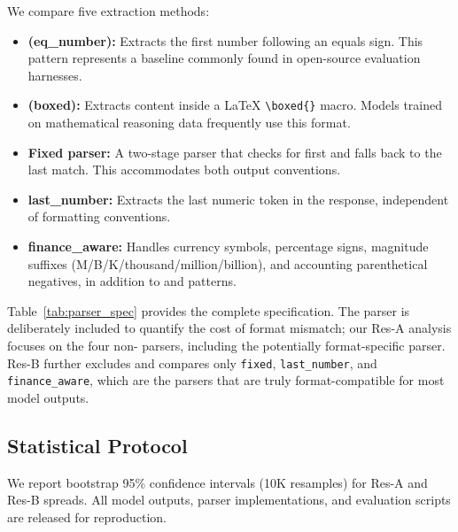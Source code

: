 We compare five extraction methods:

\begin{itemize}
    \item \textbf{\numparser{} (eq\_number):} Extracts the first number following an equals sign. This pattern represents a baseline commonly found in open-source evaluation harnesses.
    \item \textbf{\boxedparser{} (boxed):} Extracts content inside a \LaTeX{} \verb|\boxed{}| macro. Models trained on mathematical reasoning data frequently use this format.
    \item \textbf{Fixed parser:} A two-stage parser that checks for \boxedparser{} first and falls back to the last \numparser{} match. This accommodates both output conventions.
    \item \textbf{last\_number:} Extracts the last numeric token in the response, independent of formatting conventions.
    \item \textbf{finance\_aware:} Handles currency symbols, percentage signs, magnitude suffixes (M/B/K/thousand/million/billion), and accounting parenthetical negatives, in addition to \boxedparser{} and \numparser{} patterns.
\end{itemize}

Table~\ref{tab:parser_spec} provides the complete specification. The \numparser{} parser is deliberately included to quantify the cost of format mismatch; our Res-A analysis focuses on the four non-\numparser{} parsers, including the potentially format-specific \boxedparser{} parser. Res-B further excludes \boxedparser{} and compares only \texttt{fixed}, \texttt{last\_number}, and \texttt{finance\_aware}, which are the parsers that are truly format-compatible for most model outputs.



\subsection{Statistical Protocol}
\label{sec:statistics}

We report bootstrap 95\% confidence intervals (10K resamples) for Res-A and Res-B spreads. All model outputs, parser implementations, and evaluation scripts are released for reproduction.
